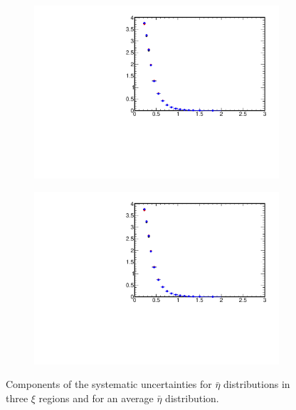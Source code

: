 \begin{figure}[h!]
\begin{subfigure}{.49\textwidth}
		\includegraphics[width=\textwidth,page=20]{chapters/chrgSTAR/img/syst/out_chargedmax.pdf}
	\end{subfigure}
	\begin{subfigure}{.49\textwidth}
		\includegraphics[width=\textwidth,page=24]{chapters/chrgSTAR/img/syst/out_chargedmax.pdf}
	\end{subfigure}
	\caption{Components of the systematic uncertainties for $\bar{\eta}$ distributions in three $\xi$ regions and for an average $\bar{\eta}$ distribution. }
	\label{fig:results_star_eta_syst}
\end{figure}

